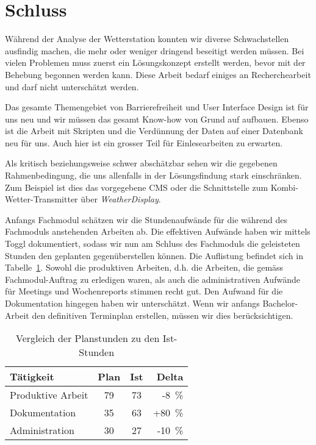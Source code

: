 \section{Schluss}
Während der Analyse der Wetterstation konnten wir diverse Schwachstellen ausfindig machen, die mehr oder weniger dringend beseitigt werden müssen.
Bei vielen Problemen muss zuerst ein Lösungskonzept erstellt werden, bevor mit der Behebung begonnen werden kann. Diese Arbeit bedarf einiges an Recherchearbeit und darf nicht unterschätzt werden.
\newline

\noindent
Das gesamte Themengebiet von Barrierefreiheit und User Interface Design ist für uns neu und wir müssen das gesamt Know-how von Grund auf aufbauen. Ebenso ist die Arbeit mit Skripten und die Verdünnung der Daten auf einer Datenbank neu für uns. Auch hier ist ein grosser Teil für Einlesearbeiten zu erwarten.
\newline

\noindent
Als kritisch beziehungsweise schwer abschätzbar sehen wir die gegebenen Rahmenbedingung, die uns allenfalls in der Lösungsfindung stark einschränken.
Zum Beispiel ist dies das vorgegebene CMS oder die Schnittstelle zum Kombi-Wetter-Transmitter über \textit{WeatherDisplay}.
\newline

\noindent
Anfangs Fachmodul schätzen wir die Stundenaufwände für die während des Fachmoduls anstehenden Arbeiten ab. Die effektiven Aufwände haben wir mittels Toggl dokumentiert, sodass wir nun am Schluss des Fachmoduls die geleisteten Stunden den geplanten gegenüberstellen können. Die Auflistung befindet sich in Tabelle~\ref{table:plan-ist}. 
Sowohl die produktiven Arbeiten, d.h. die Arbeiten, die gemäss Fachmodul-Auftrag zu erledigen waren, als auch die administrativen Aufwände für Meetings und Wochenreports stimmen recht gut. Den Aufwand für die Dokumentation hingegen haben wir unterschätzt. Wenn wir anfangs Bachelor-Arbeit den definitiven Terminplan erstellen, müssen wir dies berücksichtigen.
\newline

\begin{table}[h]
\centering
\begin{tabular}{|l|c|c|r|}
\hline
 Tätigkeit			&  Plan	& Ist  	& Delta  		\\ \hline
 Produktive Arbeit	&  79		&  73		&  -8~\%		\\ \hline
 Dokumentation		&  35		&  63		&  +80~\%		\\ \hline
 Administration		&  30		&  27		&  -10~\%		\\ \hline
\end{tabular}
\caption{Vergleich der Planstunden zu den Ist-Stunden}
\label{table:plan-ist}
\end{table}

